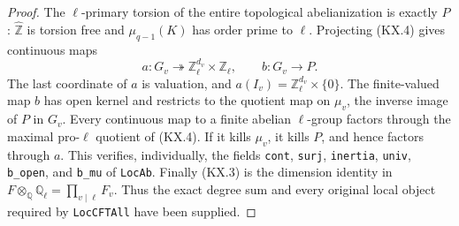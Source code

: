\begin{proof}
The $\ell$-primary torsion of the entire topological abelianization
is exactly $P$: $\widehat{\mathbb Z}$ is torsion free and
$\mu_{q-1}(K)$ has order prime to $\ell$.  Projecting (KX.4) gives
continuous maps
\[
 a:G_v\twoheadrightarrow\mathbb Z_\ell^{d_v}\times\mathbb Z_\ell,
       \qquad b:G_v\longrightarrow P.
                                                               \tag{KX.5}
\]
The last coordinate of $a$ is valuation, and
$a(I_v)=\mathbb Z_\ell^{d_v}\times\{0\}$.  The finite-valued
map $b$ has open kernel and restricts to the quotient map on
$\mu_v$, the inverse image of $P$ in $G_v$.
Every continuous map to a finite abelian $\ell$-group factors
through the maximal pro-$\ell$ quotient of (KX.4).  If it kills
$\mu_v$, it kills $P$, and hence factors through $a$.
This verifies, individually, the fields \texttt{cont},
\texttt{surj}, \texttt{inertia}, \texttt{univ},
\texttt{b\_open}, and \texttt{b\_mu} of \texttt{LocAb}.
Finally (KX.3) is the dimension identity in
$F\otimes_{\mathbb Q}\mathbb Q_\ell=\prod_{v\mid\ell}F_v$.
Thus the exact degree sum and every original local object required
by \texttt{LocCFTAll} have been supplied.
\end{proof}

